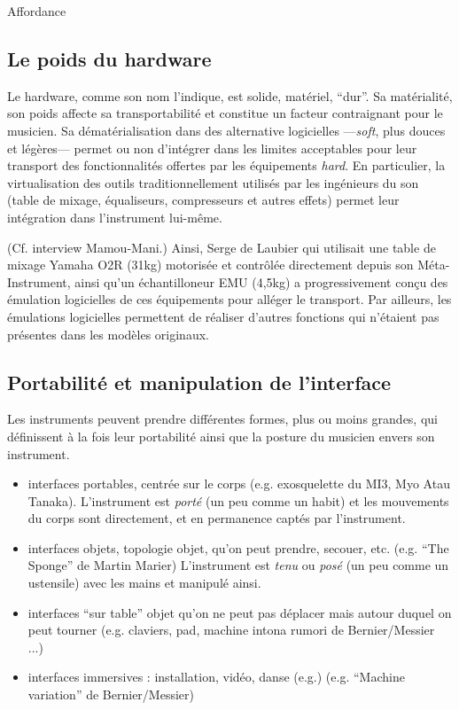 Affordance

\subsection{Le poids du hardware}

\noindent Le hardware, comme son nom l'indique, est solide, matériel, ``dur''. Sa matérialité, son poids affecte sa transportabilité et constitue un facteur contraignant pour le musicien. Sa dématérialisation dans des alternative logicielles —\textit{soft}, plus douces et légères— permet ou non d'intégrer dans les limites acceptables pour leur transport des fonctionnalités offertes par les équipements \textit{hard}.
En particulier, la virtualisation des outils traditionnellement utilisés par les ingénieurs du son (table de mixage, équaliseurs, compresseurs et autres effets) permet leur intégration dans l'instrument lui-même.

(Cf. interview Mamou-Mani.)
Ainsi, Serge de Laubier qui utilisait une table de mixage Yamaha O2R (31kg) motorisée et contrôlée directement depuis son Méta-Instrument, ainsi qu'un échantilloneur EMU (4,5kg) a progressivement conçu des émulation logicielles de ces équipements pour alléger le transport. Par ailleurs, les émulations logicielles permettent de réaliser d'autres fonctions qui n'étaient pas présentes dans les modèles originaux.


\subsection{Portabilité et manipulation de l'interface}

Les instruments peuvent prendre différentes formes, plus ou moins grandes, qui définissent à la fois leur portabilité ainsi que la posture du musicien envers son instrument.
\vspace{-1em}
\begin{itemize}[noitemsep]
	\item interfaces portables, centrée sur le corps (e.g. exosquelette du MI3, Myo Atau Tanaka). L'instrument est \textit{porté} (un peu comme un habit) et les mouvements du corps sont directement, et en permanence captés par l'instrument.
	\item interfaces objets, topologie objet, qu'on peut prendre, secouer, etc. (e.g. ``The Sponge'' de Martin Marier) L'instrument est \textit{tenu} ou \textit{posé} (un peu comme un ustensile) avec les mains et manipulé ainsi.
	\item interfaces ``sur table'' objet qu'on ne peut pas déplacer mais autour duquel on peut tourner (e.g. claviers, pad, machine intona rumori de Bernier/Messier ...)
	\item interfaces immersives : installation, vidéo, danse (e.g.) (e.g. ``Machine variation'' de Bernier/Messier)
\end{itemize}

